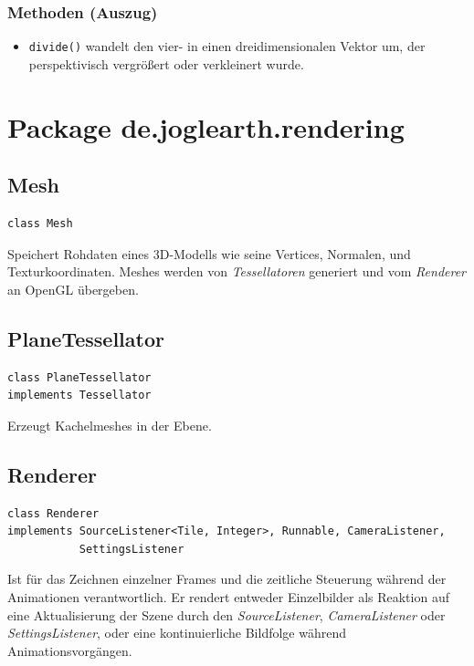 \documentclass[10pt]{scrreprt}
\begin{document}
\subsubsection*{Methoden (Auszug)}
\begin{itemize}
\item \texttt{divide()} wandelt den vier- in einen dreidimensionalen Vektor um, der perspektivisch vergrößert oder verkleinert wurde.
\end{itemize}





\vspace{5mm}
\section{Package de.joglearth.rendering}
\subsection*{Mesh}
\begin{lstlisting}
class Mesh
\end{lstlisting}
Speichert Rohdaten eines 3D-Modells wie seine Vertices, Normalen, und Texturkoordinaten. Meshes werden von \textit{Tessellatoren} generiert und vom \textit{Renderer} an OpenGL übergeben.\\

\vspace{5mm}
\subsection*{PlaneTessellator}
\begin{lstlisting}
class PlaneTessellator
implements Tessellator
\end{lstlisting}
Erzeugt Kachelmeshes in der Ebene.\\

\vspace{5mm}
\subsection*{Renderer}
\begin{lstlisting}
class Renderer
implements SourceListener<Tile, Integer>, Runnable, CameraListener,
           SettingsListener
\end{lstlisting}
Ist für das Zeichnen einzelner Frames und die zeitliche Steuerung während der Animationen verantwortlich. Er rendert entweder Einzelbilder als Reaktion auf eine Aktualisierung der Szene durch den \textit{SourceListener}, \textit{CameraListener} oder \textit{SettingsListener}, oder eine kontinuierliche Bildfolge während Animationsvorgängen.\\
\end{document}
